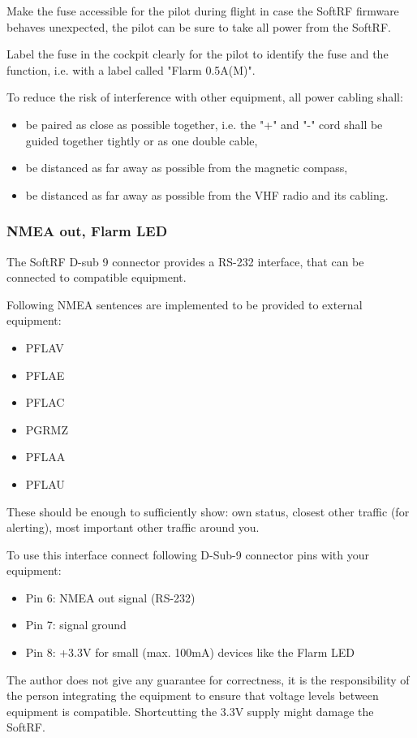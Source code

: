 \documentclass[10pt,a4paper]{article}
\begin{document}
Make the fuse accessible for the pilot during flight in case the SoftRF firmware behaves unexpected, the pilot can be sure to take all power from the SoftRF.

Label the fuse in the cockpit clearly for the pilot to identify the fuse and the function, i.e. with a label called "Flarm 0.5A(M)".

To reduce the risk of interference with other equipment, all power cabling shall:
\begin{itemize}
\item be paired as close as possible together, i.e. the "+" and "-" cord shall be guided together tightly or as one double cable,
\item be distanced as far away as possible from the magnetic compass,
\item be distanced as far away as possible from the VHF radio and its cabling.
\end{itemize}

\subsubsection{NMEA out, Flarm LED}
The SoftRF D-sub 9 connector provides a RS-232 interface, that can be connected to compatible equipment.

Following NMEA sentences are implemented to be provided to external equipment:

\begin{itemize}
\item PFLAV
\item PFLAE
\item PFLAC
\item PGRMZ
\item PFLAA
\item PFLAU
\end{itemize}

These should be enough to sufficiently show: own status, closest other traffic (for alerting), most important other traffic around you.

To use this interface connect following D-Sub-9 connector pins with your equipment:
\begin{itemize}
\item Pin 6: NMEA out signal (RS-232)
\item Pin 7: signal ground
\item Pin 8: +3.3V for small (max. 100mA) devices like the Flarm LED
\end{itemize}

The author does not give any guarantee for correctness, it is the responsibility of the person integrating the equipment to ensure that voltage levels between equipment is compatible. Shortcutting the 3.3V supply might damage the SoftRF.
\end{document}
